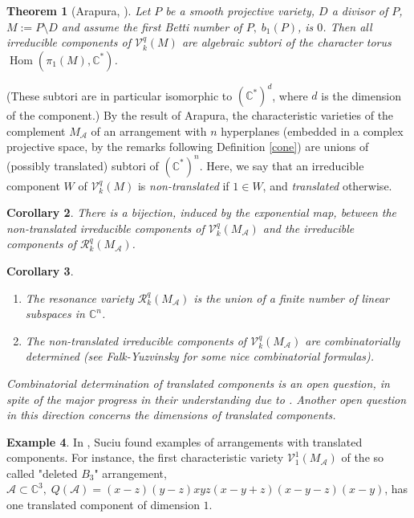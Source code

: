 \documentclass[psamsfonts]{conm-p-l}
\newtheorem{theorem}{Theorem}[section]
\newtheorem{corollary}[theorem]{Corollary}
\theoremstyle{definition}
\newtheorem{example}[theorem]{Example}
\theoremstyle{remark}
\numberwithin{equation}{section}
\newcommand{\A}{{\mathcal A}}
\newcommand{\RR}{{\mathcal R}}
\newcommand{\VV}{{\mathcal V}}
\newcommand{\C}{\mathbb{C}}
\DeclareMathOperator{\Hom}{Hom}
\begin{document}
\begin{theorem}[Arapura, \cite{A}]
\label{arapura}
Let $P$ be a smooth projective variety, $D$ a divisor of $P$, 
$M:=P\setminus D$ and assume the first Betti number of $P, \;b_1(P)$, is $0$. Then all
irreducible components of $\VV^q_k(M)$ are algebraic  subtori of
the character torus $\Hom(\pi_1(M), \C^*)$. 
\end{theorem}

(These subtori are in particular isomorphic to $(\C^*)^d$, where $d$ is the dimension
of the component.)
By the result of Arapura, the characteristic varieties of the complement $M_{\A}$
of an arrangement with $n$ hyperplanes 
(embedded in a complex projective space, by the remarks following Definition \ref{cone}) 
are unions of (possibly translated) subtori of $(\C^*)^n$. Here, we say that
an irreducible component $W$ of $\VV^q_k(M)$ is {\em non-translated} if $1 \in W$, 
and {\em translated} otherwise.


\begin{corollary}
\label{ops}
There is a bijection, induced by the exponential map, between the non-translated 
irreducible components  of $\VV^q_k(M_{\A})$ and the irreducible 
components of $\RR_{k}^{q}(M_{\A})$.
\end{corollary}


\begin{corollary}
\begin{enumerate}
\item\label{reslinear}
The resonance variety $\RR_{k}^{q}(M_\A)$ is the union of a finite number of linear subspaces in $\C^n$.
\item\label{compositiones} 
The non-translated irreducible components  of $\VV^q_k(M_{\A})$ are combinatorially
determined (see Falk-Yuzvinsky \cite{FY} for some nice combinatorial formulas).
\end{enumerate}
\end{corollary}

{\it Combinatorial determination of 
translated components is an open question, in spite of the major progress in their understanding due to \cite{D1}. Another 
open question in this direction concerns the dimensions of translated components.}

\begin{example}
\label{big}
In \cite[Example 4.1]{S0}, Suciu found examples of arrangements with translated components. 
For instance, 
the first characteristic variety $\VV^1_1(M_{\A})$ of the so called "deleted $B_3$"
arrangement, $\A \subset \C^3,\; Q(\A)=(x-z)(y-z)xyz(x-y+z)(x-y-z)(x-y)$, has
one translated component of dimension $1$.
\end{example}
\end{document}
